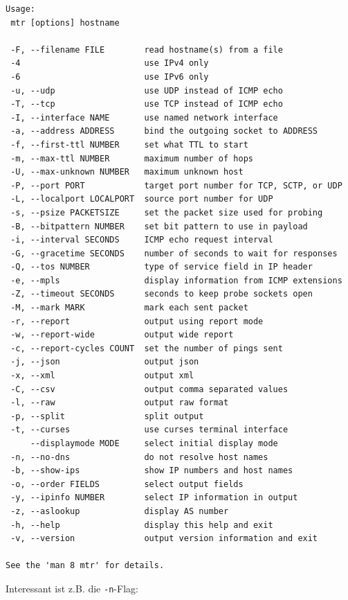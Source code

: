 \begin{verbatim}
Usage:
 mtr [options] hostname

 -F, --filename FILE        read hostname(s) from a file
 -4                         use IPv4 only
 -6                         use IPv6 only
 -u, --udp                  use UDP instead of ICMP echo
 -T, --tcp                  use TCP instead of ICMP echo
 -I, --interface NAME       use named network interface
 -a, --address ADDRESS      bind the outgoing socket to ADDRESS
 -f, --first-ttl NUMBER     set what TTL to start
 -m, --max-ttl NUMBER       maximum number of hops
 -U, --max-unknown NUMBER   maximum unknown host
 -P, --port PORT            target port number for TCP, SCTP, or UDP
 -L, --localport LOCALPORT  source port number for UDP
 -s, --psize PACKETSIZE     set the packet size used for probing
 -B, --bitpattern NUMBER    set bit pattern to use in payload
 -i, --interval SECONDS     ICMP echo request interval
 -G, --gracetime SECONDS    number of seconds to wait for responses
 -Q, --tos NUMBER           type of service field in IP header
 -e, --mpls                 display information from ICMP extensions
 -Z, --timeout SECONDS      seconds to keep probe sockets open
 -M, --mark MARK            mark each sent packet
 -r, --report               output using report mode
 -w, --report-wide          output wide report
 -c, --report-cycles COUNT  set the number of pings sent
 -j, --json                 output json
 -x, --xml                  output xml
 -C, --csv                  output comma separated values
 -l, --raw                  output raw format
 -p, --split                split output
 -t, --curses               use curses terminal interface
     --displaymode MODE     select initial display mode
 -n, --no-dns               do not resolve host names
 -b, --show-ips             show IP numbers and host names
 -o, --order FIELDS         select output fields
 -y, --ipinfo NUMBER        select IP information in output
 -z, --aslookup             display AS number
 -h, --help                 display this help and exit
 -v, --version              output version information and exit

See the 'man 8 mtr' for details.
\end{verbatim}

Interessant ist z.B. die \texttt{-n}-Flag:

